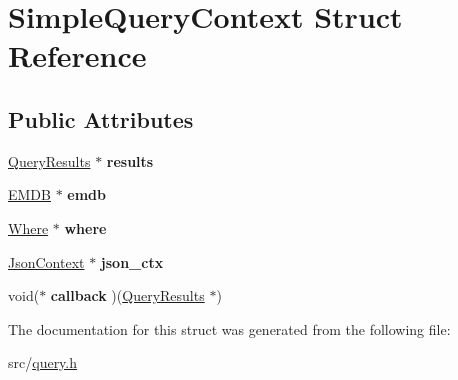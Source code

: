 \hypertarget{struct_simple_query_context}{}\section{Simple\+Query\+Context Struct Reference}
\label{struct_simple_query_context}
\subsection*{Public Attributes}
\begin{DoxyCompactItemize}
\item 
\hypertarget{struct_simple_query_context_ae8c09a985ec7b16cd31095069d884f3d}{}\hyperlink{struct_query_results}{Query\+Results} $\ast$ {\bfseries results}\label{struct_simple_query_context_ae8c09a985ec7b16cd31095069d884f3d}

\item 
\hypertarget{struct_simple_query_context_a834547c9904f5638a7502d740192e14c}{}\hyperlink{struct_e_m_d_b}{E\+M\+D\+B} $\ast$ {\bfseries emdb}\label{struct_simple_query_context_a834547c9904f5638a7502d740192e14c}

\item 
\hypertarget{struct_simple_query_context_a6d7366f1a357d8880060e9e699350c6d}{}\hyperlink{struct_where}{Where} $\ast$ {\bfseries where}\label{struct_simple_query_context_a6d7366f1a357d8880060e9e699350c6d}

\item 
\hypertarget{struct_simple_query_context_a5695acb42bbfa819e692b93113b8820b}{}\hyperlink{struct_json_context}{Json\+Context} $\ast$ {\bfseries json\+\_\+ctx}\label{struct_simple_query_context_a5695acb42bbfa819e692b93113b8820b}

\item 
\hypertarget{struct_simple_query_context_af42cc3d8a624f3759d0708cb14ec023c}{}void($\ast$ {\bfseries callback} )(\hyperlink{struct_query_results}{Query\+Results} $\ast$)\label{struct_simple_query_context_af42cc3d8a624f3759d0708cb14ec023c}

\end{DoxyCompactItemize}


The documentation for this struct was generated from the following file\+:\begin{DoxyCompactItemize}
\item 
src/\hyperlink{query_8h}{query.\+h}\end{DoxyCompactItemize}
